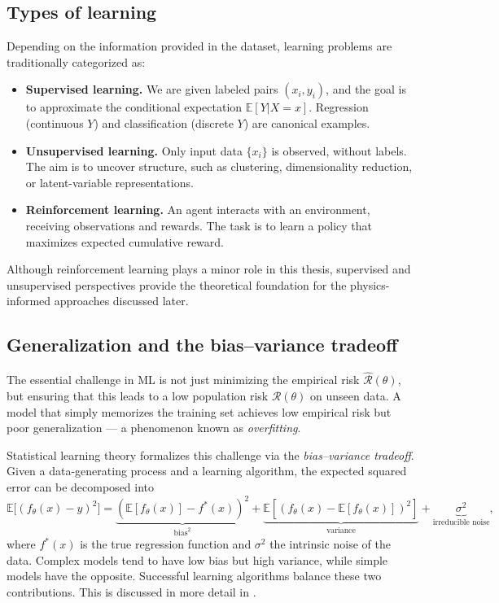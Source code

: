 \subsection{Types of learning}
Depending on the information provided in the dataset, learning problems are 
traditionally categorized as:
\begin{itemize}
  \item \textbf{Supervised learning.} We are given labeled pairs $(x_i,y_i)$, and the goal 
  is to approximate the conditional expectation $\mathbb{E}[Y|X=x]$. Regression 
  (continuous $Y$) and classification (discrete $Y$) are canonical examples.  

  \item \textbf{Unsupervised learning.} Only input data $\{x_i\}$ is observed, without labels. 
  The aim is to uncover structure, such as clustering, dimensionality reduction, 
  or latent-variable representations.  

  \item \textbf{Reinforcement learning.} An agent interacts with an environment, receiving 
  observations and rewards. The task is to learn a policy that maximizes expected 
  cumulative reward.  
\end{itemize}
Although reinforcement learning plays a minor role in this thesis, supervised and 
unsupervised perspectives provide the theoretical foundation for the 
physics-informed approaches discussed later.  

\subsection{Generalization and the bias--variance tradeoff}
The essential challenge in ML is not just minimizing the empirical risk 
$\hat{\mathcal{R}}(\theta)$, but ensuring that this leads to a low population risk 
$\mathcal{R}(\theta)$ on unseen data. A model that simply memorizes the training set 
achieves low empirical risk but poor generalization --- a phenomenon known as 
\emph{overfitting}.  

Statistical learning theory formalizes this challenge via the 
\emph{bias--variance tradeoff}. Given a data-generating process and a learning algorithm, 
the expected squared error can be decomposed into
\begin{equation}
  \mathbb{E}\big[(f_\theta(x)-y)^2\big] 
  = \underbrace{(\mathbb{E}[f_\theta(x)]-f^\ast(x))^2}_{\text{bias}^2} 
  + \underbrace{\mathbb{E}[(f_\theta(x)-\mathbb{E}[f_\theta(x)])^2]}_{\text{variance}} 
  + \underbrace{\sigma^2}_{\text{irreducible noise}},
\end{equation}
where $f^\ast(x)$ is the true regression function and $\sigma^2$ the intrinsic 
noise of the data. Complex models tend to have low bias but high variance, while 
simple models have the opposite. Successful learning algorithms balance these two 
contributions. This is discussed in more detail in \cite{HastieTibshiraniFriedman2009-ESL}.

